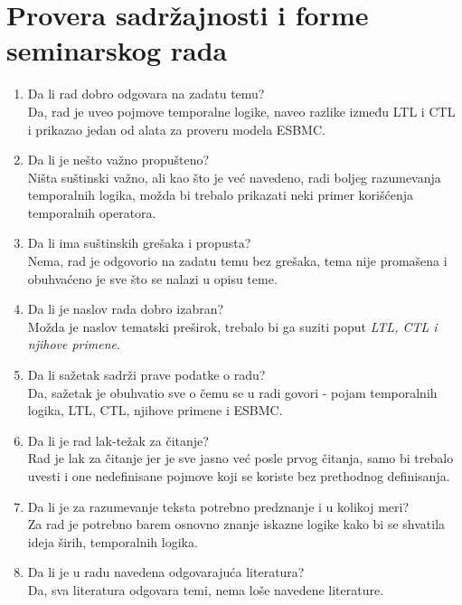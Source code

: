 \documentclass[a4paper]{report}
\newcommand{\say}[1]{\textit{#1}}
\begin{document}
\section{Provera sadržajnosti i forme seminarskog rada}

\begin{enumerate}
\item Da li rad dobro odgovara na zadatu temu?\\
Da, rad je uveo pojmove temporalne logike, naveo razlike između LTL i CTL i prikazao jedan od alata za proveru modela ESBMC.


\item Da li je nešto važno propušteno?\\
Ništa suštinski važno, ali kao što je već navedeno, radi boljeg razumevanja temporalnih logika, možda bi trebalo prikazati neki primer korišćenja temporalnih operatora.


\item Da li ima suštinskih grešaka i propusta?\\
Nema, rad je odgovorio na zadatu temu bez grešaka, tema nije promašena i obuhvaćeno je sve što se nalazi u opisu teme.


\item Da li je naslov rada dobro izabran?\\
Možda je naslov tematski preširok, trebalo bi ga suziti poput \say{LTL, CTL i njihove primene}.


\item Da li sažetak sadrži prave podatke o radu?\\
Da, sažetak je obuhvatio sve o čemu se u radi govori - pojam temporalnih logika, LTL, CTL, njihove primene i ESBMC. 


\item Da li je rad lak-težak za čitanje?\\
Rad je lak za čitanje jer je sve jasno već posle prvog čitanja, samo bi trebalo uvesti i one nedefinisane pojmove koji se koriste bez prethodnog definisanja.

 
\item Da li je za razumevanje teksta potrebno predznanje i u kolikoj meri?\\
Za rad je potrebno barem osnovno znanje iskazne logike kako bi se shvatila ideja širih, temporalnih logika.


\item Da li je u radu navedena odgovarajuća literatura?\\
Da, sva literatura odgovara temi, nema loše navedene literature.



\end{enumerate}
\end{document}
